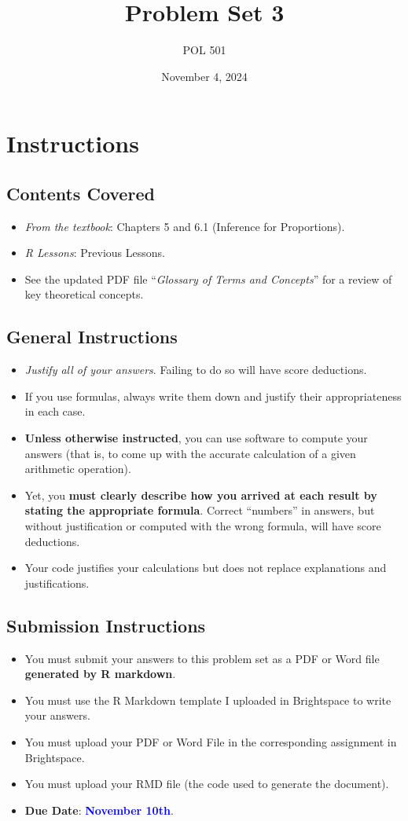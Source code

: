 \documentclass[11pt]{article}
\title{Problem Set 3}
\author{POL 501}
\date{November 4, 2024}
\begin{document}
\maketitle

\section*{Instructions}
\subsection*{Contents Covered}
\begin{itemize}
    \item \emph{From the textbook}: Chapters 5 and 6.1 (Inference for Proportions).
    \item \emph{R Lessons}: Previous Lessons.
    \item See the updated PDF file ``\emph{Glossary of Terms and Concepts}'' for a review of key theoretical concepts.
\end{itemize}
\subsection*{General Instructions}
\begin{itemize}
    \item \emph{Justify all of your answers}. Failing to do so will have score deductions.
    \item If you use formulas, always write them down and justify their appropriateness in each case.
    \item \textbf{Unless otherwise instructed}, you can use software to compute your answers (that is, to come up with the accurate calculation of a given arithmetic operation). 
    \item Yet, you \textbf{must clearly describe how you arrived at each result by stating the appropriate formula}. Correct ``numbers'' in answers, but without justification or computed with the wrong formula, will have score deductions.
    \item Your code justifies your calculations but does not replace explanations and justifications.
\end{itemize}
\subsection*{Submission Instructions}
\begin{itemize}
    \item You must submit your answers to this problem set as a PDF or Word file \textbf{generated by R markdown}.
    \item You must use the R Markdown template I uploaded in Brightspace to write your answers.
    \item You must upload your PDF or Word File in the corresponding assignment in Brightspace.
    \item You must upload your RMD file (the code used to generate the document). 
    \item \textbf{Due Date}: \textcolor{blue}{\textbf{November 10th}}.
\end{itemize}
\end{document}
